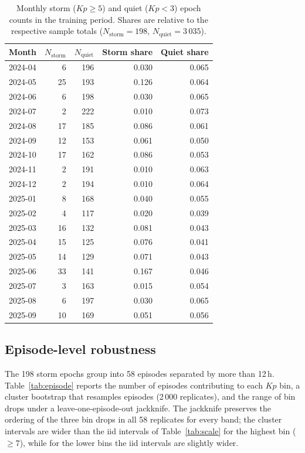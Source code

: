 \documentclass{agujournal2019}
\begin{document}
\begin{table}[h]
	\centering
	\small
	\caption{Monthly storm ($Kp \ge 5$) and quiet ($Kp < 3$) epoch counts
		in the training period. Shares are relative to the respective
		sample totals ($N_{\text{storm}} = 198$, $N_{\text{quiet}} = 3\,035$).}
	\label{tab:balance_month}
	\begin{tabular}{lrrrr}
		\toprule
		Month & $N_{\text{storm}}$ & $N_{\text{quiet}}$
		& Storm share & Quiet share \\
		\midrule
		2024-04 & 6  & 196 & 0.030 & 0.065 \\
		2024-05 & 25 & 193 & 0.126 & 0.064 \\
		2024-06 & 6  & 198 & 0.030 & 0.065 \\
		2024-07 & 2  & 222 & 0.010 & 0.073 \\
		2024-08 & 17 & 185 & 0.086 & 0.061 \\
		2024-09 & 12 & 153 & 0.061 & 0.050 \\
		2024-10 & 17 & 162 & 0.086 & 0.053 \\
		2024-11 & 2  & 191 & 0.010 & 0.063 \\
		2024-12 & 2  & 194 & 0.010 & 0.064 \\
		2025-01 & 8  & 168 & 0.040 & 0.055 \\
		2025-02 & 4  & 117 & 0.020 & 0.039 \\
		2025-03 & 16 & 132 & 0.081 & 0.043 \\
		2025-04 & 15 & 125 & 0.076 & 0.041 \\
		2025-05 & 14 & 129 & 0.071 & 0.043 \\
		2025-06 & 33 & 141 & 0.167 & 0.046 \\
		2025-07 & 3  & 163 & 0.015 & 0.054 \\
		2025-08 & 6  & 197 & 0.030 & 0.065 \\
		2025-09 & 10 & 169 & 0.051 & 0.056 \\
		\bottomrule
	\end{tabular}
\end{table}

\subsection{Episode-level robustness}

The 198 storm epochs group into 58 episodes separated by more than 12\,h.
Table~\ref{tab:episode} reports the number of episodes contributing to each
$Kp$ bin, a cluster bootstrap that resamples episodes (2\,000 replicates),
and the range of bin drops under a leave-one-episode-out jackknife. The
jackknife preserves the ordering of the three bin drops in all 58 replicates
for every band; the cluster intervals are wider than the iid intervals of
Table~\ref{tab:scale} for the highest bin ($\ge 7$), while for the lower
bins the iid intervals are slightly wider.
\end{document}
